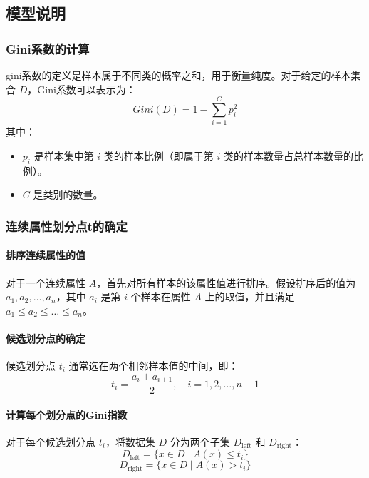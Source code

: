     \subsection{模型说明}
    \subsubsection{Gini系数的计算}
gini系数的定义是样本属于不同类的概率之和，用于衡量纯度。对于给定的样本集合 \(D\)，Gini系数可以表示为：
\begin{equation}
Gini(D) = 1 - \sum_{i=1}^{C} p_i^2
\end{equation}
其中：
\begin{itemize}
  \item \(p_i\) 是样本集中第 \(i\) 类的样本比例（即属于第 \(i\) 类的样本数量占总样本数量的比例）。
  \item \(C\) 是类别的数量。
\end{itemize}





\subsubsection{连续属性划分点t的确定}

\paragraph{排序连续属性的值}
对于一个连续属性 \(A\)，首先对所有样本的该属性值进行排序。假设排序后的值为 \(a_1, a_2, \dots, a_n\)，其中 \(a_i\) 是第 \(i\) 个样本在属性 \(A\) 上的取值，并且满足 \(a_1 \leq a_2 \leq \dots \leq a_n\)。

\paragraph{候选划分点的确定}
候选划分点 \(t_i\) 通常选在两个相邻样本值的中间，即：
\begin{equation}
t_i = \frac{a_i + a_{i+1}}{2}, \quad i = 1, 2, \dots, n-1
\end{equation}

\paragraph{计算每个划分点的Gini指数}
对于每个候选划分点 \(t_i\)，将数据集 \(D\) 分为两个子集 \(D_{\text{left}}\) 和 \(D_{\text{right}}\)：
\begin{equation}
D_{\text{left}} = \{x \in D \mid A(x) \leq t_i\}
\end{equation}
\begin{equation}
D_{\text{right}} = \{x \in D \mid A(x) > t_i\}
\end{equation}

